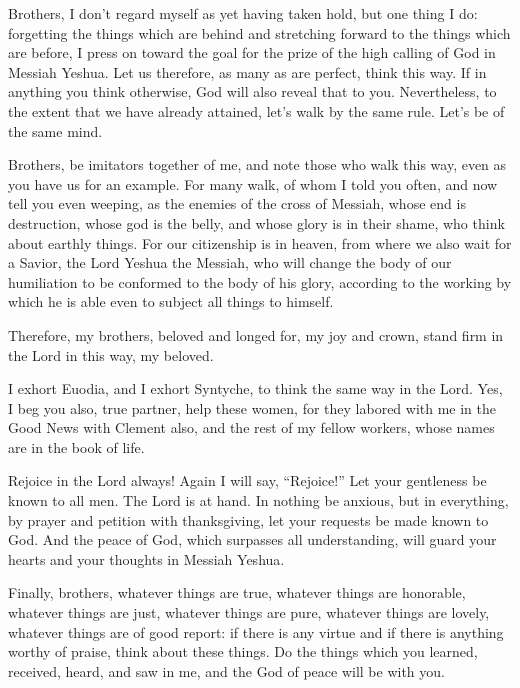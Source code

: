 \myverse{}Brothers, I don’t regard myself as yet having taken hold, but
one thing I do: forgetting the things which are behind and stretching forward to the things which are
before,
\myverse{}I press on toward the goal for the prize of the high calling of God in Messiah
Yeshua.
\myverse{}Let us therefore, as many as are perfect, think this way. If in anything you
think otherwise, God will also reveal that to you.
\myverse{}Nevertheless, to the extent that we have already attained, let’s walk by the
same rule. Let’s be of the same mind.

\myverse{}Brothers, be imitators together of me, and note those who walk
this way, even as you have us for an example.
\myverse{}For many walk, of whom I told you often, and now tell you even weeping, as
the enemies of the cross of Messiah,
\myverse{}whose end is destruction, whose god is the belly, and whose glory is in their
shame, who think about earthly things.
\myverse{}For our citizenship is in heaven, from where we also wait for a Savior, the
Lord Yeshua the Messiah,
\myverse{}who will change the body of our humiliation to be conformed to the body of
his glory, according to the working by which he is able even to subject all things to himself.


\mychapter{} \myverse*{}Therefore, my brothers, beloved and longed for, my joy and crown,
stand firm in the Lord in this way, my beloved.

\myverse{}I exhort Euodia, and I exhort Syntyche, to think the same way in
the Lord.
\myverse{}Yes, I beg you also, true partner, help these women, for they labored with me
in the Good News with Clement also, and the rest of my fellow workers, whose names are in the book of
life.

\myverse{}Rejoice in the Lord always! Again I will say, “Rejoice!”
\myverse{}Let your gentleness be known to all men. The Lord is at hand.
\myverse{}In nothing be anxious, but in everything, by prayer and petition with thanksgiving,
let your requests be made known to God.
\myverse{}And the peace of God, which surpasses all understanding, will guard your hearts
and your thoughts in Messiah Yeshua.

\myverse{}Finally, brothers, whatever things are true, whatever things are
honorable, whatever things are just, whatever things are pure, whatever things are lovely, whatever things
are of good report: if there is any virtue and if there is anything worthy of praise, think about these
things.
\myverse{}Do the things which you learned, received, heard, and saw in me, and the God
of peace will be with you.


